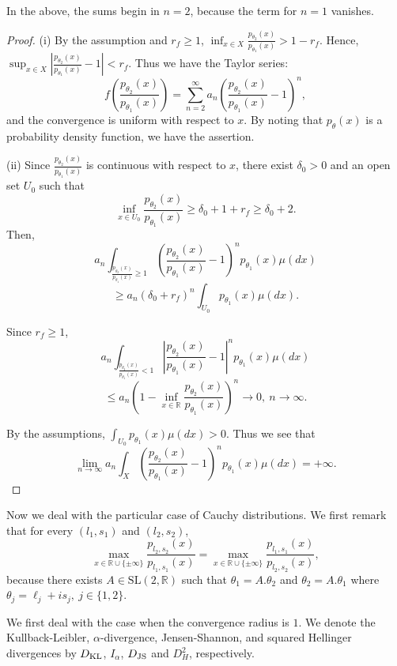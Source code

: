 \documentclass[journal]{IEEEtran}
\begin{document}
In the above, the sums begin in $n=2$, because the term for $n=1$ vanishes.

\begin{proof}
(i) By the assumption and $r_f \ge 1$, 
$\inf_{x \in X} \frac{p_{\theta_2}(x)}{p_{\theta_1}(x)} > 1-r_f$. 
Hence, 
$\sup_{x \in X} \left|\frac{p_{\theta_2}(x)}{p_{\theta_1}(x)} - 1 \right| < r_f$.
Thus we have the Taylor series:
$$
 f\left( \frac{p_{\theta_2}(x)}{p_{\theta_1}(x)} \right) =  \sum_{n=2}^{\infty} a_n  \left( \frac{p_{\theta_2}(x)}{p_{\theta_1}(x)} - 1 \right)^n,
$$
and the convergence is uniform with respect to $x$. 
By noting that $p_{\theta}(x)$ is a probability density function, 
we have the assertion. 

(ii) Since $\frac{p_{\theta_2}(x)}{p_{\theta_1}(x)}$ is continuous with respect to $x$, 
there exist $\delta_0 > 0$ and an open set $U_{0}$  such that 
$$
\inf_{x \in U_{0}} \frac{p_{\theta_2}(x)}{p_{\theta_1}(x)} \ge \delta_0 + 1+ r_f \ge \delta_0 + 2.
$$
Then, 
\[ a_n \int_{\frac{p_{\theta_2}(x)}{p_{\theta_1}(x)} \ge 1} \left( \frac{p_{\theta_2}(x)}{p_{\theta_1}(x)} - 1 \right)^n p_{\theta_1}(x) \mu(dx) \]
\[\ge a_n (\delta_0+ r_f)^n \int_{U_0} p_{\theta_1}(x) \mu(dx). \]

Since $r_f \ge 1$, 
\[ a_n \int_{\frac{p_{\theta_2}(x)}{p_{\theta_1}(x)} < 1} \left| \frac{p_{\theta_2}(x)}{p_{\theta_1}(x)} - 1 \right|^n p_{\theta_1}(x) \mu(dx)\]
\[ \le a_n \left( 1 - \inf_{x \in \mathbb R} \frac{p_{\theta_2}(x)}{p_{\theta_1}(x)} \right)^n \to 0, \ n \to \infty. \]

By the assumptions, $\int_{U_0} p_{\theta_1}(x) \mu(dx) > 0$. 
Thus we see that 
\[ \lim_{n \to \infty} a_n \int_{X} \left( \frac{p_{\theta_2}(x)}{p_{\theta_1}(x)} - 1 \right)^n p_{\theta_1}(x) \mu(dx) = +\infty. \]
\end{proof}



Now we deal with the particular case of Cauchy distributions. 
We first remark that for every $(l_1, s_1)$ and $(l_2, s_2)$, 
\[ \max_{x \in \mathbb{R} \cup \{\pm\infty\}} \frac{p_{l_2,s_2}(x)}{p_{l_1,s_1}(x)} = \max_{x \in \mathbb{R} \cup \{\pm\infty\}} \frac{p_{l_1,s_1}(x)}{p_{l_2,s_2}(x)}, \]
because there exists $A \in \mathrm{SL}(2, \mathbb R)$ such that $\theta_1 = A.\theta_2$ and $\theta_2 = A.\theta_1$ where $\theta_j = \ell_j + i s_j, \ j\in\{1,2\}$.

We first deal with the case when the convergence radius is $1$. 
We denote the Kullback-Leibler, $\alpha$-divergence, Jensen-Shannon, and squared Hellinger divergences by $D_{\mathrm{KL}}$, $I_{\alpha}$, $D_{\mathrm{JS}}$ and $D_H^2$, respectively. 
\end{document}
